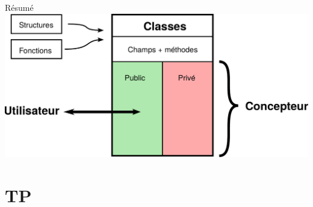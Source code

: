 \begin{frame}{Résumé}
    \centering
    \includegraphics[width=\linewidth]{images/resume.pdf}
\end{frame}

\section{TP}

